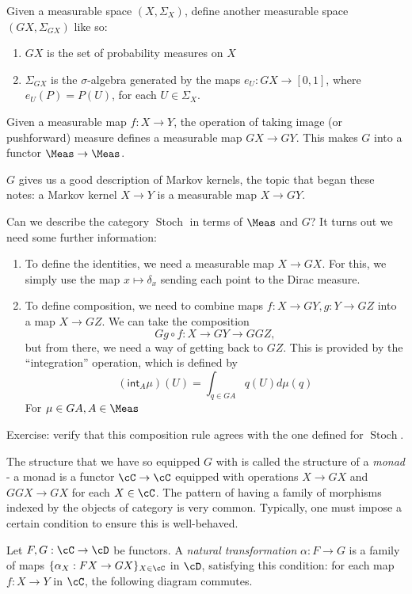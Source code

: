 \documentclass{article}
\DeclareMathOperator{\Stoch}{Stoch}
\begin{document}
\begin{example}
Given a measurable space $(X,\Sigma_X)$, define another measurable space $(GX, \Sigma_{GX})$ like so:
\begin{enumerate}
    \item $GX$ is the set of probability measures on $X$
    \item $\Sigma_{GX}$ is the $\sigma$-algebra generated by the maps $e_U: GX \to [0,1]$, where $e_U(P) = P(U)$,
    for each $U \in \Sigma_X$.
\end{enumerate}
Given a measurable map $f: X \to Y$, the operation of taking image (or pushforward) measure defines a measurable map $GX \to GY$.
This makes $G$ into a functor $\Meas \to \Meas$.

$G$ gives us a good description of Markov kernels, the topic that began these notes:
a Markov kernel $X \to Y$ is a measurable map $X \to GY$.

Can we describe the category $\Stoch$ in terms of $\Meas$ and $G$? It turns out we need some further information:
\begin{enumerate}
    \item To define the identities, we need a measurable map $X \to GX$. For this, we simply use the map $x \mapsto \delta_x$ sending each point to the Dirac measure.
    \item To define composition, we need to combine maps $f: X \to GY, g: Y \to GZ$ into a map $X \to GZ$.
    We can take the composition
    \[Gg \circ f : X \to GY \to GGZ,\]
    but from there, we need a way of getting back to $GZ$.
    This is provided by the ``integration'' operation, which is defined by
    \[(\mathsf{int}_A\mu)(U) = \int_{q \in GA}q(U)d\mu(q)\]
    For $\mu \in GA, A \in \Meas$
\end{enumerate}
Exercise: verify that this composition rule agrees with the one defined for $\Stoch$.
\end{example}

The structure that we have so equipped $G$ with is called the structure of a \emph{monad} - a monad is a functor $\cC \to \cC$ equipped with operations $X \to GX$ and $GGX \to GX$ for each $X \in \cC$.
The pattern of having a family of morphisms indexed by the objects of category is very common.
Typically, one must impose a certain condition to ensure this is well-behaved.

\begin{definition}
    Let $F,G: \cC \to \cD$ be functors.
    A \emph{natural transformation} $\alpha: F \to G$ is a family of maps $\{\alpha_X: FX \to GX\}_{X \in \cC}$ in $\cD$, satisfying this condition: for each map $f: X \to Y$ in $\cC$, the following diagram commutes.


\end{definition}
\end{document}
